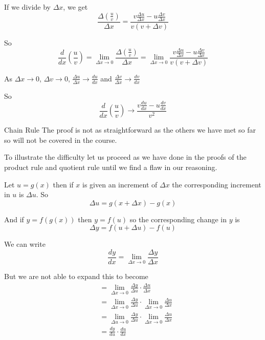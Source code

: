 If we divide by $ \Delta x$, we get
\begin{equation*}\frac{ \Delta \genfrac{(}{)}{}{}{u}{v}}{ \Delta x} =\frac{v \frac{ \Delta u}{ \Delta x} -u \frac{ \Delta v}{ \Delta x}}{v \left (v + \Delta v\right )}
\end{equation*}

So
\begin{equation*}\frac{d}{d x} \genfrac{(}{)}{}{}{u}{v} =\underset{ \Delta x \rightarrow 0}{\lim }\frac{ \Delta \genfrac{(}{)}{}{}{u}{v}}{ \Delta x} =\underset{ \Delta x \rightarrow 0}{\lim }\frac{v \frac{ \Delta u}{ \Delta x} -u \frac{ \Delta v}{ \Delta x}}{v \left (v + \Delta v\right )}
\end{equation*}

As $ \Delta x \rightarrow 0$, $ \Delta v \rightarrow 0$, $\frac{ \Delta u}{ \Delta x} \rightarrow \frac{d u}{d x}$ and $\frac{ \Delta v}{ \Delta x} \rightarrow \frac{d v}{d x}$ 

So
\begin{equation*}\frac{d}{d x} \genfrac{(}{)}{}{}{u}{v} \rightarrow \frac{v \frac{d u}{d x} -u \frac{d v}{d x}}{v^{2}}
\end{equation*}

Chain Rule
The proof is not as straightforward as the others we have met so far so will not be covered in the course. 

To illustrate the difficulty let us proceed as we have done in the proofs of the product rule and quotient rule until we find a flaw in our reasoning.


Let $u =g (x)$ then if $x$ is given an increment of $ \Delta x$ the corresponding increment in $u$ is $ \Delta u$. So
\begin{equation*} \Delta u =g (x + \Delta x) -g (x)
\end{equation*}

And if $y =f (g (x))$ then $y =f (u)$ so the corresponding change in $y$ is
\begin{equation*} \Delta y =f (u + \Delta u) -f (u)
\end{equation*}

We can write
\begin{equation*}\frac{d y}{d x} =\underset{ \Delta x \rightarrow 0}{\lim }\frac{ \Delta y}{ \Delta x}
\end{equation*}

But we are not able to expand this to become
\begin{align*} &  = \underset{ \Delta x \rightarrow 0}{\lim }\frac{ \Delta y}{ \Delta u} \cdot \frac{ \Delta u}{ \Delta x} \\
&  = \underset{ \Delta x \rightarrow 0}{\lim }\frac{ \Delta y}{ \Delta u} \cdot \underset{ \Delta x \rightarrow 0}{\lim } \frac{ \Delta u}{ \Delta x} \\
&  = \underset{ \Delta u \rightarrow 0}{\lim }\frac{ \Delta y}{ \Delta u} \cdot \underset{ \Delta x \rightarrow 0}{\lim } \frac{ \Delta u}{ \Delta x} \\
&  = \frac{d y}{d u} \cdot \frac{d u}{d x}\end{align*}

